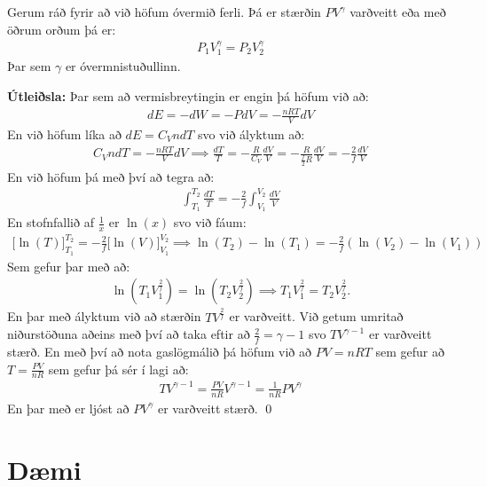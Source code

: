 \begin{tcolorbox}
\begin{theorem}
Gerum ráð fyrir að við höfum óvermið ferli. Þá er stærðin $PV^\gamma$ varðveitt eða með öðrum orðum þá er:
\begin{align*}
    P_1V_1^\gamma = P_2 V_2^\gamma
\end{align*}
Þar sem $\gamma$ er óvermnistuðullinn.
\end{theorem}
\end{tcolorbox}


\textbf{Útleiðsla:} Þar sem að vermisbreytingin er engin þá höfum við að:
\begin{align*}
    dE = -dW = -PdV = -\frac{nRT}{V}dV
\end{align*}
En við höfum líka að $dE = C_Vn dT$ svo við ályktum að:
\begin{align*}
    C_V n dT = - \frac{nRT}{V}dV \implies \frac{dT}{T} = - \frac{R}{C_V} \frac{dV}{V} = - \frac{R}{\frac{f}{2}R}\frac{dV}{V} = - \frac{2}{f} \frac{dV}{V}
\end{align*}
En við höfum þá með því að tegra að:
\begin{align*}
    \int_{T_1}^{T_2} \frac{dT}{T} = - \frac{2}{f}\int_{V_1}^{V_2} \frac{dV}{V}
\end{align*}
En stofnfallið af $\frac{1}{x}$ er $\ln(x)$ svo við fáum:
\begin{align*}
    \Big[ \ln(T) \Big]_{T_1}^{T_2} = - \frac{2}{f} \Big[ \ln(V) \Big]_{V_1}^{V_2} \implies \ln(T_2)-\ln(T_1) = -\frac{2}{f}\left( \ln(V_2) - \ln(V_1) \right)
\end{align*}
Sem gefur þar með að:
\begin{align*}
    \ln(T_1 V_1^{\frac{2}{f}}) = \ln(T_2 V_2^{\frac{2}{f}}) \implies T_1 V_1^{\frac{2}{f}} = T_2 V_2^{\frac{2}{f}}.
\end{align*}
En þar með ályktum við að stærðin $TV^{\frac{2}{f}}$ er varðveitt. Við getum umritað niðurstöðuna aðeins með því að taka eftir að $\frac{2}{f} = \gamma - 1$ svo $TV^{\gamma -1}$ er varðveitt stærð. En með því að nota gaslögmálið þá höfum við að $PV = nRT$ sem gefur að $T = \frac{PV}{nR}$ sem gefur þá sér í lagi að:
\begin{align*}
    TV^{\gamma -1} = \frac{PV}{nR}V^{\gamma -1} = \frac{1}{nR} PV^{\gamma}
\end{align*}
En þar með er ljóst að $PV^\gamma$ er varðveitt stærð. \qed

\newpage

\section{Dæmi}


